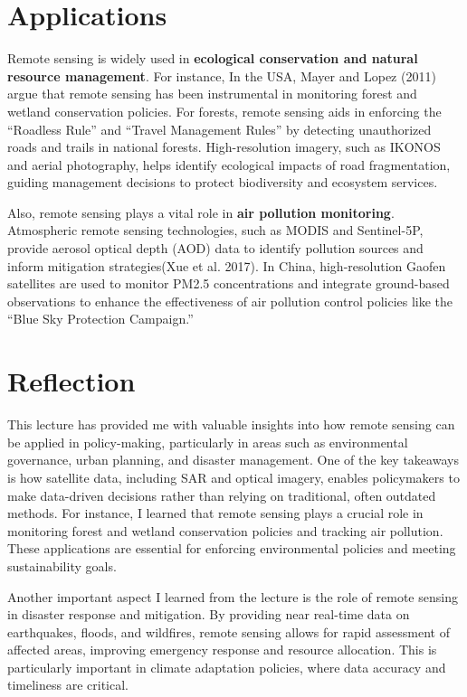 \documentclass[
  letterpaper,
]{scrbook}
\begin{document}
\section{Applications}\label{applications-2}

Remote sensing is widely used in \textbf{ecological conservation and
natural resource management}. For instance, In the USA, Mayer and Lopez
(2011) argue that remote sensing has been instrumental in monitoring
forest and wetland conservation policies. For forests, remote sensing
aids in enforcing the ``Roadless Rule'' and ``Travel Management Rules''
by detecting unauthorized roads and trails in national forests.
High-resolution imagery, such as IKONOS and aerial photography, helps
identify ecological impacts of road fragmentation, guiding management
decisions to protect biodiversity and ecosystem services.

Also, remote sensing plays a vital role in \textbf{air pollution
monitoring}. Atmospheric remote sensing technologies, such as MODIS and
Sentinel-5P, provide aerosol optical depth (AOD) data to identify
pollution sources and inform mitigation strategies(Xue et al. 2017). In
China, high-resolution Gaofen satellites are used to monitor PM2.5
concentrations and integrate ground-based observations to enhance the
effectiveness of air pollution control policies like the ``Blue Sky
Protection Campaign.''

\section{Reflection}\label{reflection-2}

This lecture has provided me with valuable insights into how remote
sensing can be applied in policy-making, particularly in areas such as
environmental governance, urban planning, and disaster management. One
of the key takeaways is how satellite data, including SAR and optical
imagery, enables policymakers to make data-driven decisions rather than
relying on traditional, often outdated methods. For instance, I learned
that remote sensing plays a crucial role in monitoring forest and
wetland conservation policies and tracking air pollution. These
applications are essential for enforcing environmental policies and
meeting sustainability goals.

Another important aspect I learned from the lecture is the role of
remote sensing in disaster response and mitigation. By providing near
real-time data on earthquakes, floods, and wildfires, remote sensing
allows for rapid assessment of affected areas, improving emergency
response and resource allocation. This is particularly important in
climate adaptation policies, where data accuracy and timeliness are
critical.
\end{document}
